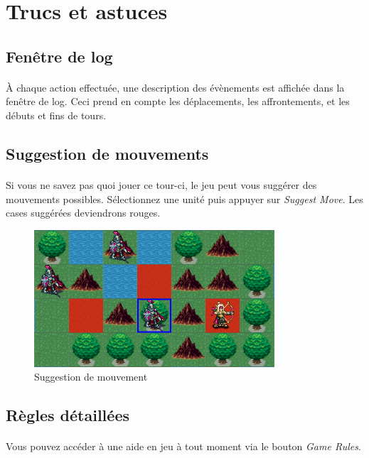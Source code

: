 \documentclass[a4paper]{article}
\begin{document}
\section{Trucs et astuces}

\subsection{Fenêtre de log}
\paragraph{}
À chaque action effectuée, une description des évènements est affichée dans la fenêtre de log. Ceci prend en compte les déplacements, les affrontements, et les débuts et fins de tours.

\subsection{Suggestion de mouvements}
\paragraph{}
Si vous ne savez pas quoi jouer ce tour-ci, le jeu peut vous suggérer des mouvements possibles. Sélectionnez une unité puis appuyer sur \textit{Suggest Move}. Les cases suggérées deviendrons rouges.

\begin{figure}[h]
\begin{center}
\includegraphics[scale=0.4]{./img/suggest_move.png}
\caption{Suggestion de mouvement}
\end{center}
\end{figure}

\subsection{Règles détaillées}
\paragraph{}
Vous pouvez accéder à une aide en jeu à tout moment via le bouton \textit{Game Rules}.
\end{document}
